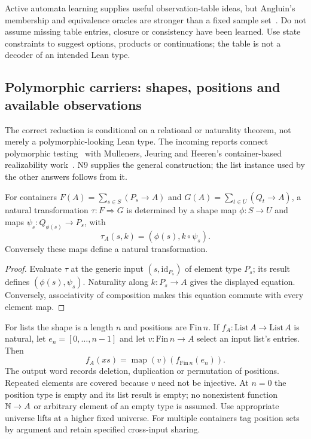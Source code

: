 Active automata learning supplies useful observation-table ideas, but Angluin's
membership and equivalence oracles are stronger than a fixed sample set~\cite{angluin}.
Do not assume missing table entries, closure or consistency have been learned.
Use state constraints to suggest options, products or continuations; the table
is not a decoder of an intended Lean type.

\subsection{Polymorphic carriers: shapes, positions and available observations}
\label{sec:carrier-parametricity}

The correct reduction is conditional on a relational or naturality theorem,
not merely a polymorphic-looking Lean type. The incoming reports connect
polymorphic testing~\cite{bernardy10,wadler89} with Mulleners, Jeuring and
Heeren's container-based realizability work~\cite{containers}. N9 supplies the general
construction; the list instance used by the other answers follows from it.

\begin{theorem}
\label{thm:carrier-containers}
For containers $F(A)=\sum_{s\in S}(P_s\to A)$ and
$G(A)=\sum_{t\in U}(Q_t\to A)$, a natural transformation
$\tau:F\Rightarrow G$ is determined by a shape map $\phi:S\to U$ and
maps $\psi_s:Q_{\phi(s)}\to P_s$, with
\[
 \tau_A(s,k)=(\phi(s),k\circ\psi_s).
\]
Conversely these maps define a natural transformation.
\end{theorem}
\begin{proof}
Evaluate $\tau$ at the generic input $(s,\mathrm{id}_{P_s})$ of element
type $P_s$; its result defines $(\phi(s),\psi_s)$. Naturality along
$k:P_s\to A$ gives the displayed equation. Conversely, associativity of
composition makes this equation commute with every element map.
\end{proof}

For lists the shape is a length $n$ and positions are $\mathrm{Fin}\,n$.
If $f_A:\mathrm{List}\,A\to\mathrm{List}\,A$ is natural, let
$e_n=[0,\ldots,n-1]$ and let $v:\mathrm{Fin}\,n\to A$ select an input
list's entries. Then
\begin{equation}\label{eq:carrier-position-test}
 f_A(xs)=\operatorname{map}(v)(f_{\mathrm{Fin}\,n}(e_n)).
\end{equation}
The output word records deletion, duplication or permutation of positions.
Repeated elements are covered because $v$ need not be injective. At $n=0$
the position type is empty and its list result is empty; no nonexistent
function $\mathbb{N}\to A$ or arbitrary element of an empty type is assumed. Use
appropriate universe lifts at a higher fixed universe. For multiple containers
tag position sets by argument and retain specified cross-input sharing.

